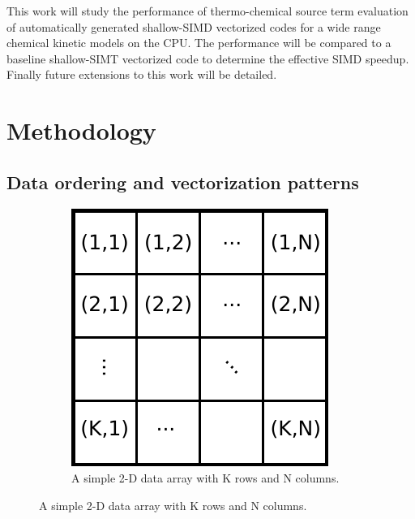 \documentclass[12pt,number,sort&compress]{elsarticle}
\begin{document}
This work will study the performance of thermo-chemical source term evaluation of automatically generated shallow-SIMD vectorized codes for a wide range chemical kinetic models on the CPU.
The performance will be compared to a baseline shallow-SIMT vectorized code to determine the effective SIMD speedup.
Finally future extensions to this work will be detailed.

\section{Methodology}
\subsection{Data ordering and vectorization patterns}
\label{S:data}

\begin{figure}[htb]
  \centering
  \begin{minipage}{0.45\linewidth}
    \begin{subfigure}[t]{\textwidth}
      \includegraphics[width=\textwidth]{data_layouts.pdf}
      \caption{A simple 2-D data array with K rows and N columns.}
      \label{F:mem}
    \end{subfigure}
  \end{minipage}
  \hfil
  \begin{minipage}{0.45\linewidth}

\end{minipage}
\end{figure}
\end{document}
